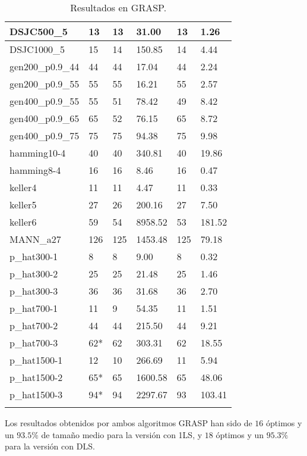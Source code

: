 \begin{small}
\begin{longtable}{l l l l l l}
    DSJC500\_5         & 13 & 13 & 31.00 & 13 & 1.26\\ \hline
    DSJC1000\_5        & 15 & 14 & 150.85 & 14 & 4.44\\ \hline
    gen200\_p0.9\_44   & 44 & 44 & 17.04 & 44 & 2.24\\ \hline
    gen200\_p0.9\_55   & 55 & 55 & 16.21 & 55 & 2.57\\ \hline
    gen400\_p0.9\_55   & 55 & 51 & 78.42 & 49 & 8.42\\ \hline
    gen400\_p0.9\_65   & 65 & 52 & 76.15 & 65 & 8.72\\ \hline
    gen400\_p0.9\_75   & 75 & 75 & 94.38 & 75 & 9.98\\ \hline
    hamming10-4        & 40 & 40 & 340.81 & 40 & 19.86\\ \hline
    hamming8-4         & 16 & 16 & 8.46 & 16 & 0.47\\ \hline
    keller4            & 11 & 11 & 4.47 & 11 & 0.33\\ \hline
    keller5            & 27 & 26 & 200.16 & 27 & 7.50\\ \hline
    keller6            & 59 & 54 & 8958.52 & 53 & 181.52\\ \hline
    MANN\_a27          & 126 & 125 & 1453.48 & 125 & 79.18\\ \hline
    p\_hat300-1        & 8 & 8 & 9.00 & 8 & 0.32\\ \hline
    p\_hat300-2        & 25 & 25 & 21.48 & 25 & 1.46\\ \hline
    p\_hat300-3        & 36 & 36 & 31.68 & 36 & 2.70\\ \hline
    p\_hat700-1        & 11 & 9 & 54.35 & 11 & 1.51\\ \hline
    p\_hat700-2        & 44 & 44 & 215.50 & 44 & 9.21\\ \hline
    p\_hat700-3        & 62* & 62 & 303.31 & 62 & 18.55\\ \hline
    p\_hat1500-1       & 12 & 10 & 266.69 & 11 & 5.94 \\ \hline
    p\_hat1500-2       & 65* & 65 & 1600.58 & 65 & 48.06\\ \hline
    p\_hat1500-3       & 94* & 94 & 2297.67 & 93 & 103.41\\ \hline
  \caption{Resultados en GRASP.}
\end{longtable}
\end{small}

Los resultados obtenidos por ambos algoritmos GRASP han sido de $16$ óptimos y un
$93.5\%$ de tamaño medio para la versión con 1LS, y $18$ óptimos y un $95.3\%$ para
la versión con DLS.

